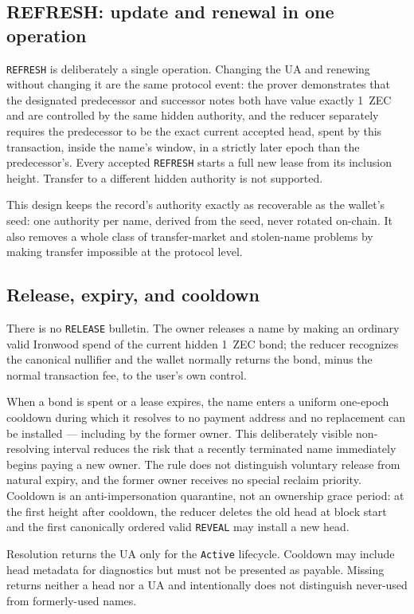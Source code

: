 \documentclass[11pt]{article}
\newcommand{\operation}[1]{\texttt{#1}}
\newcommand{\code}[1]{\texttt{#1}}
\begin{document}
\subsection{REFRESH: update and renewal in one operation}

\operation{REFRESH} is deliberately a single operation. Changing the UA and
renewing without changing it are the same protocol event: the prover
demonstrates that the designated predecessor and successor notes both have
value exactly 1~ZEC and are controlled by the same hidden authority, and the
reducer separately requires the predecessor to be the exact current accepted
head, spent by this transaction, inside the name's window, in a strictly later
epoch than the predecessor's. Every accepted \operation{REFRESH} starts a
full new lease from its inclusion height. Transfer to a different hidden
authority is not supported.

This design keeps the record's authority exactly as recoverable as the
wallet's seed: one authority per name, derived from the seed, never rotated
on-chain. It also removes a whole class of transfer-market and stolen-name
problems by making transfer impossible at the protocol level.

\subsection{Release, expiry, and cooldown}

There is no \operation{RELEASE} bulletin. The owner releases a name by making
an ordinary valid Ironwood spend of the current hidden 1~ZEC bond; the
reducer recognizes the canonical nullifier and the wallet normally returns
the bond, minus the normal transaction fee, to the user's own control.

When a bond is spent or a lease expires, the name enters a uniform one-epoch
cooldown during which it resolves to no payment address and no replacement
can be installed --- including by the former owner. This deliberately visible
non-resolving interval reduces the risk that a recently terminated name
immediately begins paying a new owner. The rule does not distinguish
voluntary release from natural expiry, and the former owner receives no
special reclaim priority. Cooldown is an anti-impersonation quarantine, not
an ownership grace period: at the first height after cooldown, the reducer
deletes the old head at block start and the first canonically ordered valid
\operation{REVEAL} may install a new head.

Resolution returns the UA only for the \code{Active} lifecycle. Cooldown may
include head metadata for diagnostics but must not be presented as payable.
Missing returns neither a head nor a UA and intentionally does not distinguish
never-used from formerly-used names.
\end{document}
